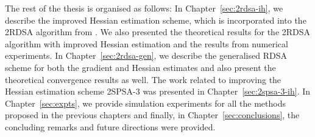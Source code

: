 The rest of the thesis is organised as follows: In Chapter~\ref{sec:2rdsa-ih}, we describe the improved Hessian estimation scheme, which is incorporated into the  2RDSA algorithm from \cite{prashanth2015rdsa}. We also presented the theoretical results for the 2RDSA algorithm with  improved Hessian estimation and the results from numerical experiments. In Chapter~\ref{sec:2rdsa-gen}, we describe the generalised RDSA scheme for both the gradient and Hessian estimates and also present the theoretical convergence results as well. The work related to improving the Hessian estimation scheme 2SPSA-3 was presented in Chapter~\ref{sec:2spsa-3-ih}. In Chapter~\ref{sec:expts}, we provide simulation experiments for all the methods proposed in the previous chapters and finally, in  Chapter~\ref{sec:conclusions}, the concluding remarks and future directions were provided.

